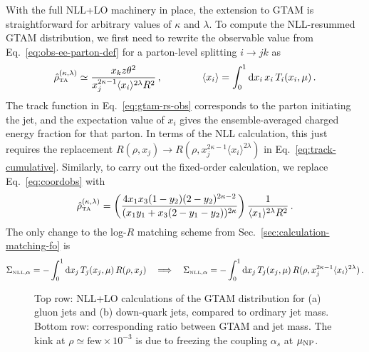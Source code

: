 \documentclass[letterpaper,11pt]{article}
\newcommand{\Sec}[1]{Sec.~\ref{#1}}
\newcommand{\Eq}[1]{Eq.~\eqref{#1}}
\begin{document}
With the full NLL+LO machinery in place, the extension to GTAM is straightforward for arbitrary values of $\kappa$ and $\lambda$.
%
To compute the NLL-resummed GTAM distribution, we first need to rewrite the observable value from \Eq{eq:obs-ee-parton-def} for a parton-level splitting $i\rightarrow jk$ as
\begin{equation}
\label{eq:gtam-rs-obs}
\hat{\rho}_{\mbox{\tiny TA}}^{(\kappa,\lambda)} \simeq \frac{x_kz \theta^2}{x_j^{2\kappa-1}\langle x_i\rangle^{2\lambda}R^2}  \, , \qquad \qquad \langle x_i\rangle = \int_0^1 \text{d}x_i\, x_i \, T_i(x_i,\mu)\,.
\end{equation}
The track function in \Eq{eq:gtam-rs-obs} corresponds to the parton initiating the jet, and the expectation value of $x_i$ gives the ensemble-averaged charged energy fraction for that parton.
%
In terms of the NLL calculation, this just requires the replacement $R(\rho,x_j) \rightarrow R(\rho, x_j^{2\kappa-1}\langle x_i\rangle^{2\lambda})$ in \Eq{eq:track-cumulative}.
%
Similarly, to carry out the fixed-order calculation, we replace \Eq{eq:coordobs} with 
\begin{equation}
\label{eq:gtam-fo-obs}
\hat{\rho}_{\mbox{\tiny TA}}^{(\kappa,\lambda)} = \left( \frac{4x_1x_3(1-y_2)(2-y_2)^{2\kappa-2}}{(x_1 y_1 + x_3 (2-y_1-y_2))^{2\kappa}}\right)\frac{1}{\langle x_1\rangle^{2\lambda}R^2}\,.
\end{equation}
The only change to the log-$R$ matching scheme from \Sec{sec:calculation-matching-fo} is
\begin{equation}
\label{eq:gtam-matching-dist}
\Sigma_{\mbox{\tiny NLL,}\alpha} = - \int_0^1 \text{d}x_j\, T_j(x_j,\mu)\, R(\rho,x_j) \quad \Longrightarrow \quad \Sigma_{\mbox{\tiny NLL,}\alpha} = - \int_0^1 \text{d}x_j\, T_j(x_j,\mu)\, R(\rho,x_j^{2\kappa-1}\langle x_i\rangle^{2\lambda})\,.
\end{equation}


\begin{figure}[t]
	\centering
	
	\caption{Top row: NLL+LO calculations of the GTAM distribution for (a) gluon jets and (b) down-quark jets, compared to ordinary jet mass.  Bottom row: corresponding ratio between GTAM and jet mass. The kink at $\rho \simeq \text{few} \times 10^{-3}$ is due to freezing the coupling $\alpha_s$ at $\mu_{\rm NP}$.}
	\label{fig:gtam-matched}
\end{figure}
\end{document}
